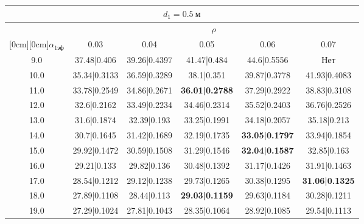 \documentclass[20pt]{article}
\begin{document}
\begin{center}
\begin{tabular}{c|ccccc}
\hline
	\multicolumn{6}{c}{$d_{1}=0.5 \ м$} \\
\hline
	 & \multicolumn{5}{|c}{$\rho$} \\
	\cline{2-6}
	\raisebox{1.5ex}[0cm][0cm]{$\alpha_{1эф}$} & 0.03 & 0.04 & 0.05 & 0.06 & 0.07\\
\hline
	9.0 & 	37.48|0.406 & 	39.26|0.4397 & 	41.47|0.484 & 	44.6|0.5556 & 	Нет\\
	10.0 & 	35.34|0.3133 & 	36.59|0.3289 & 	38.1|0.351 & 	39.87|0.3778 & 	41.93|0.4083\\
	11.0 & 	33.78|0.2549 & 	34.86|0.2671 & 	\textbf{36.01|0.2788} & 	37.29|0.2922 & 	38.83|0.3108\\
	12.0 & 	32.6|0.2162 & 	33.49|0.2234 & 	34.46|0.2314 & 	35.52|0.2403 & 	36.76|0.2526\\
	13.0 & 	31.6|0.1874 & 	32.39|0.193 & 	33.25|0.1991 & 	34.18|0.2057 & 	35.18|0.213\\
	14.0 & 	30.7|0.1645 & 	31.42|0.1689 & 	32.19|0.1735 & 	\textbf{33.05|0.1797} & 	33.94|0.1854\\
	15.0 & 	29.92|0.1472 & 	30.59|0.1508 & 	31.29|0.1546 & 	\textbf{32.04|0.1587} & 	32.85|0.163\\
	16.0 & 	29.21|0.133 & 	29.82|0.136 & 	30.48|0.1392 & 	31.17|0.1426 & 	31.91|0.1463\\
	17.0 & 	28.54|0.1212 & 	29.12|0.1238 & 	29.73|0.1265 & 	30.38|0.1295 & 	\textbf{31.06|0.1325}\\
	18.0 & 	27.89|0.1108 & 	28.44|0.113 & 	\textbf{29.03|0.1159} & 	29.63|0.1184 & 	30.28|0.1211\\
	19.0 & 	27.29|0.1024 & 	27.81|0.1043 & 	28.35|0.1064 & 	28.92|0.1085 & 	29.54|0.1113\\
\end{tabular}


\end{center}
\end{document}
